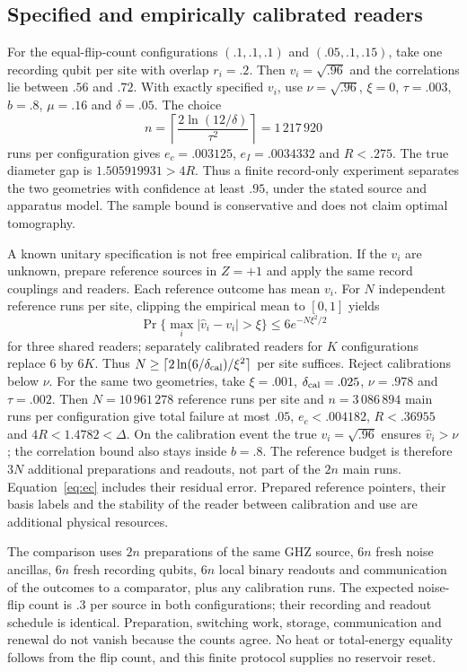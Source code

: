 \documentclass[12pt,a4paper]{article}
\begin{document}
\subsection{Specified and empirically calibrated readers}
For the equal-flip-count configurations $(.1,.1,.1)$ and
$(.05,.1,.15)$, take one recording qubit per site with overlap
$r_i=.2$. Then $v_i=\sqrt{.96}$ and the correlations lie between
$.56$ and $.72$. With exactly specified $v_i$, use $\nu=\sqrt{.96}$,
$\xi=0$, $\tau=.003$, $b=.8$, $\mu=.16$ and $\delta=.05$.
The choice
\[
n=\left\lceil\frac{2\ln(12/\delta)}{\tau^2}\right\rceil
  =1\,217\,920
\]
runs per configuration gives $e_c=.003125$,
$e_I=.0034332$ and $R<.275$.
The true diameter gap is $1.505919931>4R$.
Thus a finite record-only experiment separates the two geometries
with confidence at least $.95$, under the stated source and apparatus
model. The sample bound is conservative and does not claim optimal
tomography.

A known unitary specification is not free empirical calibration.
If the $v_i$ are unknown, prepare reference sources in $Z=+1$ and
apply the same record couplings and readers. Each reference outcome
has mean $v_i$. For $N$ independent reference runs per site,
clipping the empirical mean to $[0,1]$ yields
\[
\Pr\{\max_i|\widehat v_i-v_i|>\xi\}
   \le6e^{-N\xi^2/2}
\]
for three shared readers; separately calibrated readers for $K$
configurations replace $6$ by $6K$. Thus $N\ge\lceil2\ln(6/\delta_{\rm cal})/\xi^2\rceil$ per site
suffices. Reject calibrations below $\nu$.
For the same two geometries, take $\xi=.001$,
$\delta_{\rm cal}=.025$, $\nu=.978$ and $\tau=.002$.
Then $N=10\,961\,278$ reference runs per site and
$n=3\,086\,894$ main runs per configuration give total failure
at most $.05$, $e_c<.004182$, $R<.36955$ and $4R<1.4782<\Delta$.
On the calibration event the true $v_i=\sqrt{.96}$ ensures
$\widehat v_i>\nu$; the correlation bound also stays inside $b=.8$.
The reference budget is therefore $3N$ additional preparations and
readouts, not part of the $2n$ main runs.
Equation~\eqref{eq:ec} includes their residual error. Prepared
reference pointers, their basis labels and the stability of the
reader between calibration and use are additional physical resources.

The comparison uses $2n$ preparations of the same GHZ source,
$6n$ fresh noise ancillas, $6n$ fresh recording qubits, $6n$ local
binary readouts and communication of the outcomes to a comparator,
plus any calibration runs. The expected noise-flip count is $.3$
per source in both configurations; their recording and readout
schedule is identical. Preparation, switching work, storage,
communication and renewal do not vanish because the counts agree.
No heat or total-energy equality follows from the flip count, and
this finite protocol supplies no reservoir reset.
\end{document}
